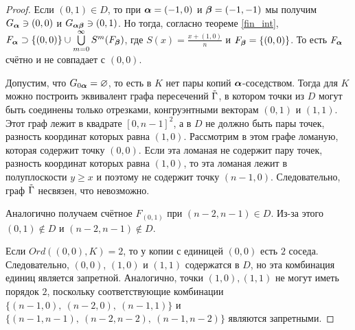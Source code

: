 \begin{proof}
Если $(0,1)\in D$, то при ${\bm{\alpha}}=(-1,0)$ и ${\bm{\beta}}=(-1,-1)$ мы получим $G_{\bm{\alpha}}\ni(0,0)$ и $G_{{\bm{\alpha}}{\bm{\beta}}}\ni(0,1)$.
Но тогда, согласно теореме \ref{fin_int}, $F_{\bm{\alpha}}\supset\{(0,0)\}\cup\bigcup\limits_{m=0}^\infty S^m(F_{\bm{\beta}})$, где $S(x)=\frac{x+(1,0)}{n}$ и $F_{\bm{\beta}}=\{(0,0)\}$.
То есть $F_{\bm{\alpha}}$ счётно и не совпадает с $(0,0)$.

Допустим, что $G_{0{\bm{\alpha}}}=\varnothing$, то есть в $K$ нет пары копий ${\bm{\alpha}}$-соседством.
Тогда для $K$ можно построить эквивалент графа пересечений $\tilde{\Gamma}$, в котором точки из $D$ могут быть соединены только отрезками, конгруэнтными векторам $(0,1)$ и $(1,1)$.
Этот граф лежит в квадрате $[0,n-1]^2$, а в $D$ не должно быть пары точек, разность координат которых равна $(1,0)$.
Рассмотрим в этом графе ломаную, которая содержит точку $(0,0)$.
Если эта ломаная не содержит пару точек, разность координат которых равна $(1,0)$, то эта ломаная лежит в полуплоскости $y\ge x$  и поэтому не содержит точку $(n-1,0)$.
Следовательно, граф $\tilde{\Gamma}$ несвязен, что невозможно.

Аналогично получаем счётное $F_{(0,1)}$ при $(n-2,n-1)\in D$.
Из-за этого $(0,1)\notin D$ и $(n-2,n-1)\notin D$. 
 
Если $Ord((0,0),K)=2$, то у копии с единицей $(0,0)$ есть $2$ соседа. 
Следовательно, $(0,0)$, $(1,0)$ и $(1,1)$ содержатся в  $D$, но эта комбинация единиц является запретной.
Аналогично, точки $(1,0), (1,1)$ не могут иметь порядок $2$, поскольку соответствующие комбинации $\{(n-1,0),\ (n-2,0),\ (n-1,1)\}$ и $\{(n-1,n-1),\ (n-2,n-2),\ (n-1,n-2)\}$ являются запретными. 
\end{proof} 


